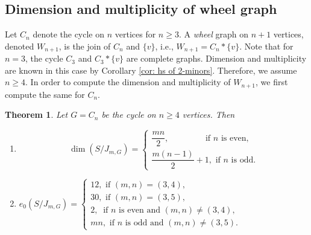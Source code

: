 \documentclass[12pt,reqno]{amsart}
\theoremstyle{plain}
\newtheorem{theorem}{Theorem}[section]
\theoremstyle{definition}
\begin{document}
 \subsection{Dimension and multiplicity of wheel graph}
\noindent
\vspace{2mm}


 Let $C_n$ denote the cycle on $n$ vertices for $n\geq 3$.  A \emph{wheel} graph on $n+1$ vertices, denoted $W_{n+1}$, is the join of $C_n$ and $\{v\}$, i.e., $W_{n+1}=C_n*\{v\}$. Note that for $n=3$, the cycle $C_3$ and $C_3*\{v\}$ are complete graphs. Dimension and multiplicity are known in this case by Corollary \ref{cor: hs of 2-minors}. Therefore, we assume $n\geq 4$. In order to compute the dimension and multiplicity of $W_{n+1}$, we first compute the same for $C_n$.
 \begin{theorem}\label{thm: dim and multiplicity of Cycles}
     Let $G=C_n$ be the cycle on $n\geq 4$ vertices. Then
     \begin{enumerate}
         \item\label{dim of cycle} $$\dim(S/J_{m,G})=\begin{cases}
             \dfrac{mn}{2}, \qquad\qquad\text{ if $n$ is even},\\
             \dfrac{m(n-1)}{2}+1, \text{ if $n$ is odd}.
         \end{cases}$$
         \item\label{multiplicity of cycle} $e_0(S/J_{m,G})=\begin{cases}
             12, \text{ if $(m,n)=(3,4)$},\\
             30, \text{ if $(m,n)=(3,5)$},\\
             2, ~ \text{ if $n$ is even and $(m,n)\neq (3,4)$},\\
             mn, \text{ if $n$ is odd and $(m,n)\neq (3,5)$}.
         \end{cases}$
     \end{enumerate}
 \end{theorem}
\end{document}
